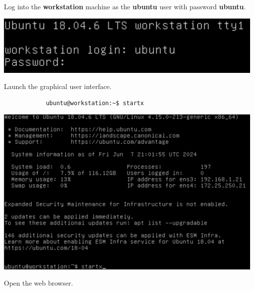 \documentclass[letterpaper, 12pt]{article}
\begin{document}
\begin{enumerate}
    \begin{labstep}
        Log into the \textbf{workstation} machine as the \textbf{ubuntu} user with password \textbf{ubuntu}.

        \begin{center}
            \includegraphics[width=\linewidth]{images/part1/step1.png}
        \end{center}
    \end{labstep}

    \begin{labstep}
        Launch the graphical user interface.
        \begin{lstlisting}
            ubuntu@workstation:~$ startx
        \end{lstlisting}

        \begin{center}
            \includegraphics[width=\linewidth]{images/part1/step2.png}
        \end{center}
    \end{labstep}

    \begin{labstep}
        Open the web browser.


\end{labstep}
\end{enumerate}
\end{document}
